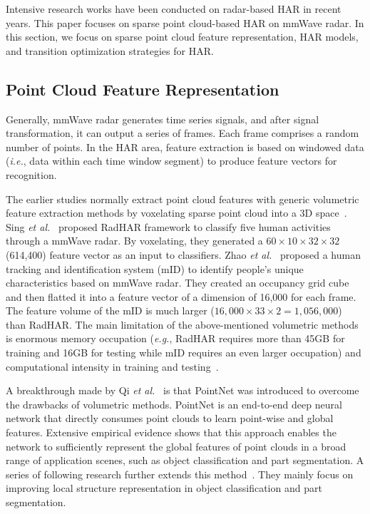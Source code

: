 Intensive research works have been conducted on radar-based HAR in recent years. 
This paper focuses on sparse point cloud-based HAR on mmWave radar. 
In this section, we focus on sparse point cloud feature representation, HAR models, and transition optimization strategies for HAR. 

\subsection{Point Cloud Feature Representation}

Generally, mmWave radar generates time series signals, and after signal transformation, it can output a series of frames. 
Each frame comprises a random number of points. In the HAR area, feature extraction is based on windowed data (\textit{i.e.}, data within each time window segment) to produce feature vectors for recognition. 

The earlier studies normally extract point cloud features with generic volumetric feature extraction methods by voxelating sparse point cloud into a 3D space~\cite{singh2019radhar,zhao2019mid}. 
Sing \textit{et al.}~\cite{singh2019radhar} proposed RadHAR framework to classify five human activities through a mmWave radar. 
By voxelating, they generated a $60 \times 10 \times 32 \times 32$ (614,400) feature vector as an input to classifiers. Zhao \textit{et al.}~\cite{zhao2019mid} proposed a human tracking and identification system (mID) to identify people’s unique characteristics based on mmWave radar. They created an occupancy grid cube and then flatted it into a feature vector of a dimension of 16,000 for each frame.
The feature volume of the mID is much larger ($16,000 \times 33 \times 2=1,056,000$) than RadHAR. 
The main limitation of the above-mentioned volumetric methods is enormous memory occupation (\textit{e.g.}, RadHAR requires more than 45GB for training and 16GB for testing while mID requires an even larger occupation) and computational intensity in training and testing~\cite{zhou2018voxelnet}.

A breakthrough made by Qi \textit{et al.}~\cite{qi2017pointnet} is that PointNet was introduced to overcome the drawbacks of volumetric methods. 
PointNet is an end-to-end deep neural network that directly consumes point clouds to learn point-wise and global features. Extensive empirical evidence shows that this approach enables the network to sufficiently represent the global features of point clouds in a broad range of application scenes, such as object classification and part segmentation. 
A series of following research further extends this method~\cite{qi2017pointnet++,li2018pointcnn,wang2019dynamic,liu2024point, han2024mamba3d,saydam2023feature}. 
They mainly focus on improving local structure representation in object classification and part segmentation.  

